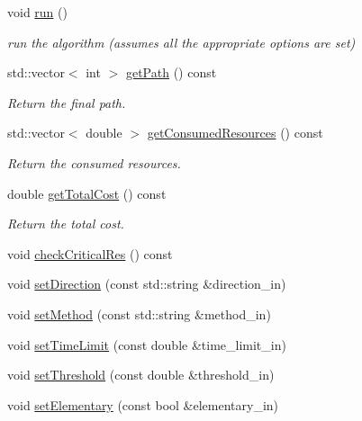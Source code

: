 \begin{DoxyCompactItemize}
void \hyperlink{classbidirectional_1_1BiDirectional_ac29ad49abb6001ad50f4dac4a5775b3c}{run} ()
\begin{DoxyCompactList}\small\item\em run the algorithm (assumes all the appropriate options are set) \end{DoxyCompactList}\item 
std\+::vector$<$ int $>$ \hyperlink{classbidirectional_1_1BiDirectional_a25af01f68ffce330a85922d02aa2ce88}{get\+Path} () const
\begin{DoxyCompactList}\small\item\em Return the final path. \end{DoxyCompactList}\item 
std\+::vector$<$ double $>$ \hyperlink{classbidirectional_1_1BiDirectional_a426412403ca7693f52b12a198d3f57c5}{get\+Consumed\+Resources} () const
\begin{DoxyCompactList}\small\item\em Return the consumed resources. \end{DoxyCompactList}\item 
double \hyperlink{classbidirectional_1_1BiDirectional_a7f18313a5858ce248b7819f7c214a43f}{get\+Total\+Cost} () const
\begin{DoxyCompactList}\small\item\em Return the total cost. \end{DoxyCompactList}\item 
void \hyperlink{classbidirectional_1_1BiDirectional_ad57667c8edeafda55eba523d02ff33e6}{check\+Critical\+Res} () const
\item 
void \hyperlink{classbidirectional_1_1BiDirectional_ac0961c36b450c9886562b0c63156da12}{set\+Direction} (const std\+::string \&direction\+\_\+in)
\item 
void \hyperlink{classbidirectional_1_1BiDirectional_a11320df93ad8e5747aa1f3e14cbe44bd}{set\+Method} (const std\+::string \&method\+\_\+in)
\item 
void \hyperlink{classbidirectional_1_1BiDirectional_af21bde5b9190abb4f0ea10ef3f8b30b4}{set\+Time\+Limit} (const double \&time\+\_\+limit\+\_\+in)
\item 
void \hyperlink{classbidirectional_1_1BiDirectional_a007a9d61310ec94a2470c75dd62b537a}{set\+Threshold} (const double \&threshold\+\_\+in)
\item 
void \hyperlink{classbidirectional_1_1BiDirectional_aafbbf3fb26308432be606799903f430e}{set\+Elementary} (const bool \&elementary\+\_\+in)
\item 

\end{DoxyCompactItemize}
